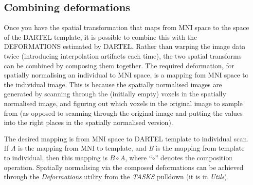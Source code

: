 \subsection{Combining deformations}
Once you have the spatial transformation that maps from MNI space to the space of the DARTEL template, it is possible to combine this with the DEFORMATIONS estimated by DARTEL.
Rather than warping the image data twice (introducing interpolation artifacts each time), the two spatial transforms can be combined by composing them together.
The required deformation, for spatially normalising an individual to MNI space, is a mapping fom MNI space to the individual image.
This is because the spatially normalised images are generated by scanning through the (initially empty) voxels in the spatially normalised image, and figuring out which voxels in the original image to sample from (as opposed to scanning through the original image and putting the values into the right places in the spatially normalised version).

The desired mapping is from MNI space to DARTEL template to individual scan.
If \emph{A} is the mapping from MNI to template, and \emph{B} is the mapping from template to individual, then this mapping is $B \circ A$, where ``$\circ$'' denotes the composition operation.
Spatially normalising via the composed deformations can be achieved through the \emph{Deformations} utility from the \emph{TASKS} pulldown (it is in \emph{Utils}). 

